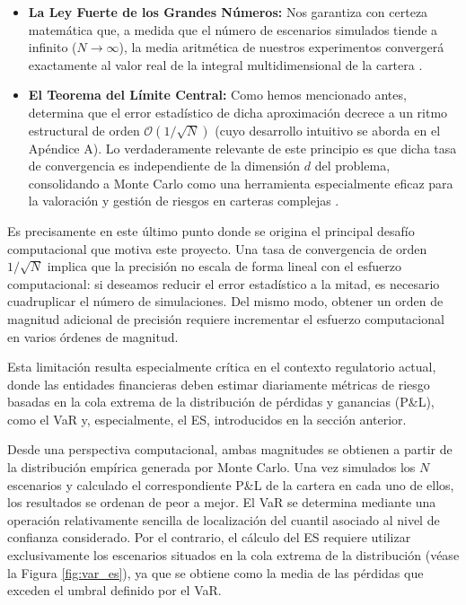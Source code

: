 \documentclass[11pt]{article}
\begin{document}
\begin{itemize}
\item \textbf{La Ley Fuerte de los Grandes Números:} Nos garantiza con certeza matemática que, a medida que el número de escenarios simulados tiende a infinito ($N \to \infty$), la media aritmética de nuestros experimentos convergerá exactamente al valor real de la integral multidimensional de la cartera \cite{degroot2012probability}.

\item \textbf{El Teorema del Límite Central:} Como hemos mencionado antes, determina que el error estadístico de dicha aproximación decrece a un ritmo estructural de orden $\mathcal{O}(1/\sqrt{N})$ (cuyo desarrollo intuitivo se aborda en el Apéndice A). Lo verdaderamente relevante de este principio es que dicha tasa de convergencia es independiente de la dimensión $d$ del problema, consolidando a Monte Carlo como una herramienta especialmente eficaz para la valoración y gestión de riesgos en carteras complejas \cite{degroot2012probability}.

\end{itemize}

Es precisamente en este último punto donde se origina el principal desafío computacional que motiva este proyecto. Una tasa de convergencia de orden $1/\sqrt{N}$ implica que la precisión no escala de forma lineal con el esfuerzo computacional: si deseamos reducir el error estadístico a la mitad, es necesario cuadruplicar el número de simulaciones. Del mismo modo, obtener un orden de magnitud adicional de precisión requiere incrementar el esfuerzo computacional en varios órdenes de magnitud.

Esta limitación resulta especialmente crítica en el contexto regulatorio actual, donde las entidades financieras deben estimar diariamente métricas de riesgo basadas en la cola extrema de la distribución de pérdidas y ganancias (P\&L), como el VaR y, especialmente, el ES, introducidos en la sección anterior.

Desde una perspectiva computacional, ambas magnitudes se obtienen a partir de la distribución empírica generada por Monte Carlo. Una vez simulados los $N$ escenarios y calculado el correspondiente P\&L de la cartera en cada uno de ellos, los resultados se ordenan de peor a mejor. El VaR se determina mediante una operación relativamente sencilla de localización del cuantil asociado al nivel de confianza considerado. Por el contrario, el cálculo del ES requiere utilizar exclusivamente los escenarios situados en la cola extrema de la distribución (véase la Figura \ref{fig:var_es}), ya que se obtiene como la media de las pérdidas que exceden el umbral definido por el VaR.
\end{document}
